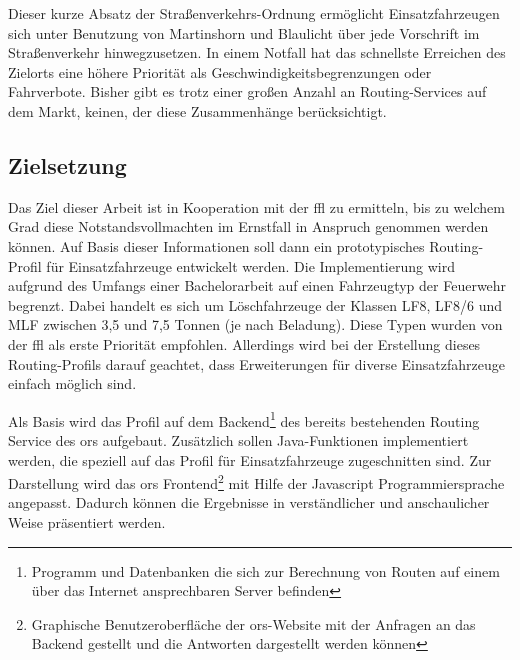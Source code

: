 \vspace{1.2cm}

Dieser kurze Absatz der Straßenverkehrs-Ordnung ermöglicht Einsatzfahrzeugen sich unter Benutzung von Martinshorn und Blaulicht über jede Vorschrift im Straßenverkehr hinwegzusetzen.
In einem Notfall hat das schnellste Erreichen des Zielorts eine höhere Priorität als Geschwindigkeitsbegrenzungen oder Fahrverbote.
Bisher gibt es trotz einer großen Anzahl an Routing-Services auf dem Markt, keinen, der diese Zusammenhänge berücksichtigt.

\subsection{Zielsetzung}
Das Ziel dieser Arbeit ist in Kooperation mit der \gls{ffl} zu ermitteln, bis zu welchem Grad diese Notstandsvollmachten im Ernstfall in Anspruch genommen werden können.
Auf Basis dieser Informationen soll dann ein prototypisches Routing-Profil für Einsatzfahrzeuge entwickelt werden.
Die Implementierung wird aufgrund des Umfangs einer Bachelorarbeit auf einen Fahrzeugtyp der Feuerwehr begrenzt.
Dabei handelt es sich um Löschfahrzeuge der Klassen LF8, LF8/6 und MLF zwischen 3,5 und 7,5 Tonnen (je nach Beladung).
Diese Typen wurden von der \gls{ffl} als erste Priorität empfohlen.
Allerdings wird bei der Erstellung dieses Routing-Profils darauf geachtet, dass Erweiterungen für diverse Einsatzfahrzeuge einfach möglich sind.
\vspace{0.5cm}

Als Basis wird das Profil auf dem Backend\footnote{Programm und Datenbanken die sich zur Berechnung von Routen auf einem über das Internet ansprechbaren Server befinden} des bereits bestehenden Routing Service des \gls{ors} aufgebaut.
Zusätzlich sollen Java-Funktionen implementiert werden, die speziell auf das Profil für Einsatzfahrzeuge zugeschnitten sind.
Zur Darstellung wird das \gls{ors} Frontend\footnote{Graphische Benutzeroberfläche der \gls{ors}-Website mit der Anfragen an das Backend gestellt und die Antworten dargestellt werden können} mit Hilfe der Javascript Programmiersprache angepasst.
Dadurch können die Ergebnisse in verständlicher und anschaulicher Weise präsentiert werden.